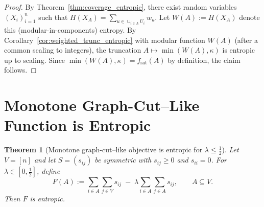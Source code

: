 \documentclass[conference]{IEEEtran}
\newtheorem{theorem}{Theorem}
\theoremstyle{definition}
\theoremstyle{remark}
\begin{document}
\begin{proof}
By Theorem~\ref{thm:coverage_entropic}, there exist random variables $(X_i)_{i=1}^n$ such that
$H(X_A)=\sum_{u\in \cup_{i\in A}U_i} w_u$.
Let $W(A):=H(X_A)$ denote this (modular-in-components) entropy.
By Corollary~\ref{cor:weighted_trunc_entropic} with modular function $W(A)$ (after a common scaling to integers),
the truncation $A\mapsto \min(W(A),\kappa)$ is entropic up to scaling.
Since $\min(W(A),\kappa)=f_{\mathrm{sat}}(A)$ by definition, the claim follows.
\end{proof}

\section{Monotone Graph-Cut--Like Function is Entropic} \label{sec:graph-cut}

\begin{theorem}[Monotone graph-cut--like objective is entropic for $\lambda\le \tfrac12$]
\label{thm:monotone_graphcut_entropic}
Let $V=[n]$ and let $S=(s_{ij})$ be symmetric with $s_{ij}\ge 0$ and $s_{ii}=0$.
For $\lambda\in[0,\tfrac12]$, define
\[
F(A):=\sum_{i\in A}\sum_{j\in V} s_{ij} \;-\; \lambda \sum_{i\in A}\sum_{j\in A} s_{ij},\qquad A\subseteq V.
\]
Then $F$ is entropic.
\end{theorem}
\end{document}
